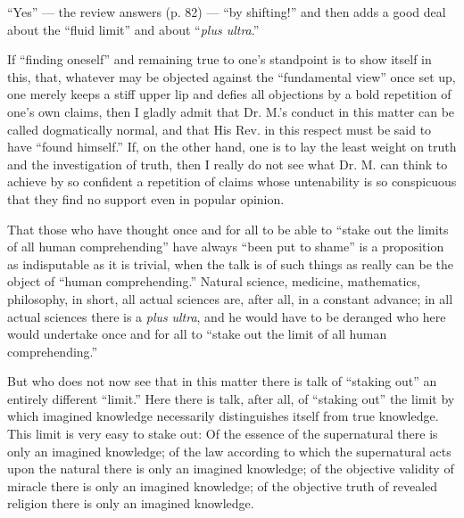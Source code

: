 \documentclass[12pt,a4paper,openany]{book}
\newcommand{\opage}[1]{\marginnote{\footnotesize\textit{[#1]}}}
\begin{document}
``Yes'' --- the review answers (p. 82) --- ``by
\setcounter{footnote}{0}%
\opage{56}shifting!'' and then adds a good deal about the ``fluid limit''
and about ``\textit{plus ultra}.''

If ``finding oneself'' and remaining true to one's standpoint
is to show itself in this, that, whatever may be objected
against the ``fundamental view'' once set up, one merely keeps
a stiff upper lip and defies all objections by a bold
repetition of one's own claims, then I gladly admit that
Dr. M.'s conduct in this matter can be called dogmatically normal,
and that His Rev. in this respect must be said to have
``found himself.'' If, on the other hand, one is to lay the least weight
on truth and the investigation of truth, then I really do not see
what Dr. M. can think to achieve by so confident
a repetition of claims whose untenability is so
conspicuous that they find no support even in popular
opinion.

That those who have thought once and for all to be able to
``stake out the limits of all human comprehending'' have always
``been put to shame'' is a proposition as indisputable as it is trivial,
when the talk is of such things as really
can be the object of ``human comprehending.'' Natural science,
medicine, mathematics, philosophy, %
in short, all actual sciences are, after all, in a constant
advance; in all actual sciences there is a \textit{plus}
\textit{ultra}, and he would have to be deranged who here would undertake
once and for all to ``stake out the limit of all human
comprehending.''

But who does not now see that in this matter there is talk of
``staking out'' an entirely different ``limit.'' Here there is talk, after all, of
``staking out'' the limit by which imagined knowledge
necessarily distinguishes itself from true knowledge. This
\setcounter{footnote}{0}%
\opage{57}limit is very easy to stake out: Of the essence of the supernatural
there is only an imagined knowledge; of the law according to which
the supernatural acts upon the natural there is
only an imagined knowledge; of the objective validity of miracle
there is only an imagined knowledge; of the objective truth of revealed
religion there is only an imagined knowledge.
\end{document}
